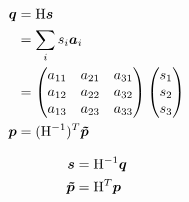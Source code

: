 \documentclass[11pt,a4paper,uplatex]{jsarticle}
\begin{document}
\begin{align}
    \bm{q} &= {\rm H} \bm{s} \\
    &= \sum_{i} s_{i} \bm{a}_{i} \\
    &=          \begin{pmatrix} 
        a_{11} & a_{21} & a_{31} \\
        a_{12} & a_{22} & a_{32} \\
        a_{13} & a_{23} & a_{33} \\
    \end{pmatrix} 
    \begin{pmatrix}
        s_{1} \\ s_{2} \\ s_{3} 
    \end{pmatrix} \\
    \bm{p} &= ({\rm H}^{-1})^{T} \bm{\tilde{p}} 
\end{align}  

\begin{align}
    \bm{s} &= {\rm H}^{-1} \bm{q}\\
    \bm{\tilde{p}} &= {\rm H}^{T} \bm{p}
\end{align}
\end{document}
